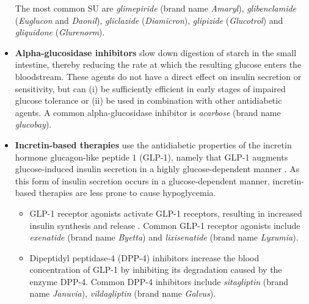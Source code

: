 \begin{itemize}
        The most common SU are \emph{glimepiride} (brand name \emph{Amaryl}), \emph{glibenclamide} (\emph{Euglucon} and \emph{Daonil}), \emph{gliclazide} (\emph{Diamicron}), \emph{glipizide} (\emph{Glucotrol}) and \emph{gliquidone} (\emph{Glurenorm}). \\
\item \textbf{Alpha-glucosidase inhibitors} slow down digestion of starch in the small intestine, thereby reducing the rate at which the resulting glucose enters the bloodstream. These agents do not have a direct effect on insulin secretion or sensitivity, but can (i) be sufficiently efficient in early stages of impaired glucose tolerance or (ii) be used in combination with other antidiabetic agents. 
A common alpha-glucosidase inhibitor is \emph{acarbose} (brand name \emph{glucobay}). \\
\item \textbf{Incretin-based therapies} use the antidiabetic properties of the incretin hormone glucagon-like peptide 1 (GLP-1), namely that GLP-1 augments glucose-induced insulin secretion in a highly glucose-dependent manner \citep{nauck2009incretin,lovshin2009incretin}. As this form of insulin secretion occurs in a glucose-dependent manner, incretin-based therapies are less prone to cause hypoglycemia.
\begin{itemize}
        \item GLP-1 receptor agonists activate GLP-1 receptors, resulting in increased insulin synthesis and release \citep{drucker1987glucagon}. Common GLP-1 receptor agonists include \emph{exenatide} (brand name \emph{Byetta}) and \emph{lixisenatide} (brand name \emph{Lyxumia}). \\
        \item Dipeptidyl peptidase-4 (DPP-4) inhibitors increase the blood concentration of GLP-1 by inhibiting its degradation caused by the enzyme DPP-4. Common DPP-4 inhibitors include \emph{sitagliptin} (brand name \emph{Januvia}), \emph{vildagliptin} (brand name \emph{Galvus}).  \\
\end{itemize}
\end{itemize} 




